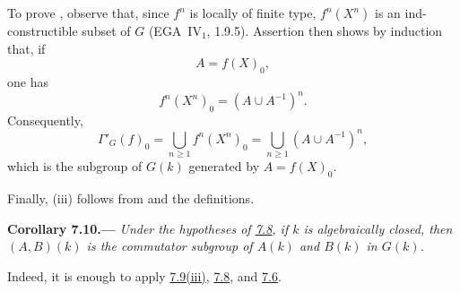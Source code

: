 To prove \textup{}, observe that, since \(f^n\) is locally
of finite type, \(f^n(X^n)\) is an ind-constructible subset
of \(G\) (EGA~IV\(_1\), 1.9.5).
Assertion \textup{} then shows by induction that, if
\[
  A=f(X)_0,
\]
one has
\[
  f^n(X^n)_0=(A\cup A^{-1})^n.
\]
Consequently,
\label{form:sga3-VIB-7.9-generated-rational-points}%
\[
  \Gamma'_G(f)_0
    =\bigcup_{n\geq1}f^n(X^n)_0
    =\bigcup_{n\geq1}(A\cup A^{-1})^n,
\]
which is the subgroup of \(G(k)\) generated by
\(A=f(X)_0\).

Finally, \textup{(iii)} follows from \textup{} and the
definitions.

\medskip
{}\label{cor:sga3-VIB-7.10}%
\noindent\textbf{Corollary 7.10.---}%
\emph{Under the hypotheses of
\hyperref[prop:sga3-VIB-7.8]{7.8}, if \(k\) is algebraically
closed, then \((A,B)(k)\) is the commutator subgroup of
\(A(k)\) and \(B(k)\) in \(G(k)\).}

Indeed, it is enough to apply
\hyperref[concl:sga3-VIB-7.9-iii]{7.9\textup{(iii)}},
\hyperref[prop:sga3-VIB-7.8]{7.8}, and
\hyperref[prop:sga3-VIB-7.6]{7.6}.
